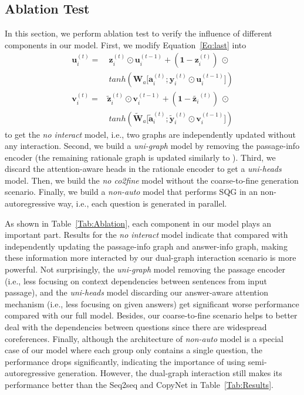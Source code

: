 \documentclass[11pt,a4paper]{article}
\begin{document}
\subsection{Ablation Test}
In this section, we perform ablation test to verify the influence of different components in our model. First, we modify Equation~\ref{Eq:last} into
\begin{equation} \label{Eq:new}
\begin{split}
\bm u_i^{(t)} =& ~\bm z_i^{(t)} \odot \bm u_i^{(t-1)} + (\bm 1 - \bm z_i^{(t)}) ~\odot \\
& ~ tanh (\bm W_a \bm [\bm a_i^{(t)}; \bm y_i^{(t)} \odot \bm u_i^{(t-1)}]) \\
\bm v_i^{(t)} =& \tilde{\bm z}_i^{(t)} \odot \bm v_i^{(t-1)} + (\bm 1 - \tilde{\bm z_i}^{(t)}) ~\odot \\
& ~ tanh (\tilde{\bm W}_a \bm [\tilde{\bm a}_i^{(t)}; \tilde{\bm y}_i^{(t)} \odot \bm v_i^{(t-1)}])
\end{split}
\end{equation} to get the \textit{no interact} model, i.e., two graphs are independently updated without any interaction. Second, we build a \textit{uni-graph} model by removing the passage-info encoder (the remaining rationale graph is updated similarly to \citet{li2015gated}). Third, we discard the attention-aware heads in the rationale encoder to get a \textit{uni-heads} model. Then, we build the \textit{no co2fine} model without the coarse-to-fine generation scenario. Finally, we build a \textit{non-auto} model that performs SQG in an non-autoregressive way, i.e., each question is generated in parallel.

As shown in Table~\ref{Tab:Ablation}, each component in our model plays an important part. 
Results for the \textit{no interact} model indicate that compared with independently updating the passage-info graph and answer-info graph, making these information more interacted by our dual-graph interaction scenario is more powerful. 
Not surprisingly, the \textit{uni-graph} model removing the passage encoder (i.e., less focusing on context dependencies between sentences from input passage), and the \textit{uni-heads} model discarding our answer-aware attention mechanism  (i.e., less focusing on given answers) get significant worse performance compared with our full model. 
Besides, our coarse-to-fine scenario helps to better deal with the dependencies between questions since there are widespread coreferences. 
Finally, although the architecture of \textit{non-auto} model is a special case of our model where each group only contains a single question, the performance drops significantly, indicating the importance of using semi-autoregressive generation. However, the dual-graph interaction still makes its performance better than the Seq2seq and CopyNet in Table~\ref{Tab:Results}.
\end{document}
